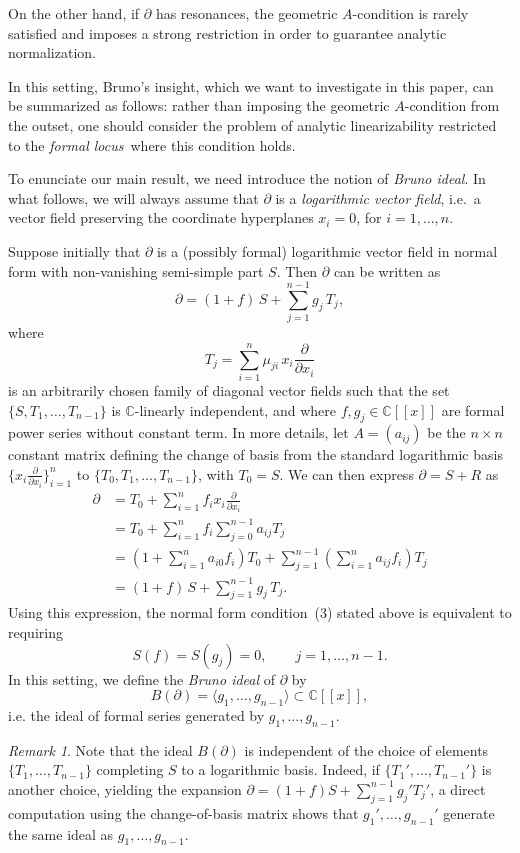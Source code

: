 \documentclass[10pt,twoside,reqno]{amsart}
\theoremstyle{remark}
\theoremstyle{remark}
\newtheorem{remark}[thm]{Remark}
\begin{document}
On the other hand, if $\partial$ has resonances, the geometric $A$-condition is rarely satisfied and 
imposes a strong restriction in order to guarantee analytic normalization.

In this setting, Bruno's insight, which we want to investigate in this paper, can be summarized as follows: rather than imposing the geometric $A$-condition from the outset, one should consider the problem of analytic linearizability restricted to the {\em formal locus} where this condition holds.

To enunciate our main result, we need introduce the notion of {\em Bruno ideal}. In what follows, we will always assume that $\partial$ is a {\em logarithmic vector field}, i.e.~a vector field preserving the coordinate hyperplanes $x_i = 0$, for $i=1,\ldots,n$. 

Suppose initially that \(\partial\) is a (possibly formal) logarithmic vector field in
normal form with non-vanishing semi-simple part \(S\). Then \(\partial\) can be
written as
\[
\partial = (1+f)\,S + \sum_{j=1}^{n-1} g_j\, T_j,
\]
where
\[
T_j = \sum_{i=1}^n \mu_{ji}\, x_i \frac{\partial}{\partial x_i}
\]
is an arbitrarily chosen family of diagonal vector fields such that the set
\(\{S, T_1, \ldots, T_{n-1}\}\) is \(\mathbb{C}\)-linearly independent, and where
\(f, g_j \in \mathbb{C}[[x]]\) are formal power series without constant term. In more details, let $A=(a_{ij})$ be the $n\times n$ constant matrix defining the change of basis from the standard logarithmic basis $\{x_i \frac{\partial}{\partial x_i}\}_{i=1}^n$ to $\{T_0, T_1, \ldots, T_{n-1}\}$, with $T_0=S$. We can then express $\partial = S+R$ as
\begin{align*}
\partial &= T_0 + \sum_{i=1}^{n} f_i x_i \frac{\partial}{\partial x_i} \\
         &= T_0 + \sum_{i=1}^n f_i \sum_{j=0}^{n-1} a_{i j} T_j \\
         &= \left( 1+ \sum_{i=1}^n a_{i0} f_i \right) T_0 + \sum_{j=1}^{n-1} \left( \sum_{i=1}^n a_{ij} f_i \right) T_j\\
         &= (1+f)\,S + \sum_{j=1}^{n-1} g_j\, T_j.
\end{align*}
Using this expression, the normal form condition~(3) stated above is equivalent to requiring
\[
S(f) = S(g_j) = 0, \qquad j = 1, \ldots, n-1.
\]
In this setting, we define the \emph{Bruno ideal} of \(\partial\) by
\[
B(\partial) = \langle g_1, \ldots, g_{n-1} \rangle \subset \mathbb{C}[[x]],
\]
i.e. the ideal of formal series generated by $g_1,...,g_{n-1}$. 
\begin{remark}
Note that the ideal $B(\partial)$ is independent of the choice of elements $\{T_1, \ldots, T_{n-1}\}$ completing $S$ to a logarithmic basis. Indeed, if $\{T_1', \ldots, T_{n-1}'\}$ is another choice, yielding the expansion $\partial = (1+f)S + \sum_{j=1}^{n-1} g_j' T_j'$, a direct computation using the change-of-basis matrix shows that $g_1', \ldots, g_{n-1}'$ generate the same ideal as $g_1, \ldots, g_{n-1}$.
\end{remark}
\end{document}
